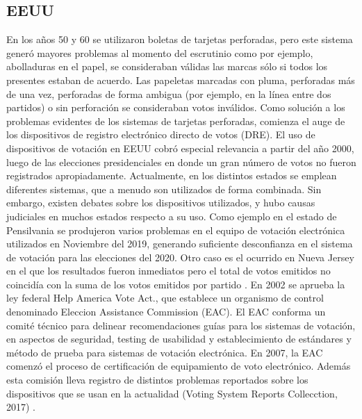 \subsection{EEUU}
En los años 50 y 60 se utilizaron boletas de tarjetas perforadas, pero este sistema generó mayores problemas al momento del escrutinio como por ejemplo, abolladuras en el papel, se consideraban válidas las marcas sólo si todos los presentes estaban de acuerdo. Las papeletas marcadas con pluma, perforadas más de una vez, perforadas de forma ambigua (por ejemplo, en la línea entre dos partidos) o sin perforación se consideraban votos inválidos.
Como solución a los problemas evidentes de los sistemas de tarjetas perforadas, comienza el auge de los dispositivos de registro electrónico directo de votos (DRE). El uso de dispositivos de votación en EEUU cobró especial relevancia a partir del año 2000, luego de las elecciones presidenciales en donde un gran número de votos no fueron registrados apropiadamente.  \newline
Actualmente, en los distintos estados se emplean diferentes sistemas, que a menudo son utilizados de forma combinada.
Sin embargo, existen debates sobre los dispositivos utilizados, y hubo causas judiciales en muchos estados respecto a su uso. Como ejemplo en el estado de Pensilvania se produjeron varios problemas en el equipo de votación electrónica utilizados en Noviembre del 2019, generando suficiente desconfianza en el sistema de votación para las elecciones del 2020. Otro caso es el ocurrido en Nueva Jersey en el que los resultados fueron inmediatos pero el total de votos emitidos no coincidía con la suma de los votos emitidos por partido \cite{eleccionesEEUU}.
En 2002 se aprueba la ley federal Help America Vote Act., que establece un organismo de control denominado Eleccion Assistance Commission (EAC). El EAC conforma un comité técnico para delinear recomendaciones guías para los sistemas de votación, en aspectos de seguridad, testing de usabilidad y establecimiento de estándares y método de prueba para sistemas de votación electrónica. En 2007, la EAC comenzó el proceso de certificación de equipamiento de voto electrónico. Además esta comisión lleva registro de distintos problemas reportados sobre los dispositivos que se usan en la actualidad (Voting System Reports Collecction, 2017) \cite{problemasReportados}.

